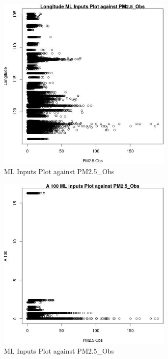 \begin{figure} 
\centering  
\includegraphics[width=0.77\textwidth]{Code_Outputs/Report_ML_input_PM25_Step4_part_e_de_duplicated_aves_LongitudevPM25_Obs.jpg} 
\caption{\label{fig:Report_ML_input_PM25_Step4_part_e_de_duplicated_avesLongitudevPM25_Obs}ML Inputs Plot against PM2.5_Obs} 
\end{figure} 
 

\begin{figure} 
\centering  
\includegraphics[width=0.77\textwidth]{Code_Outputs/Report_ML_input_PM25_Step4_part_e_de_duplicated_aves_A_100vPM25_Obs.jpg} 
\caption{\label{fig:Report_ML_input_PM25_Step4_part_e_de_duplicated_avesA_100vPM25_Obs}ML Inputs Plot against PM2.5_Obs} 
\end{figure} 
 

